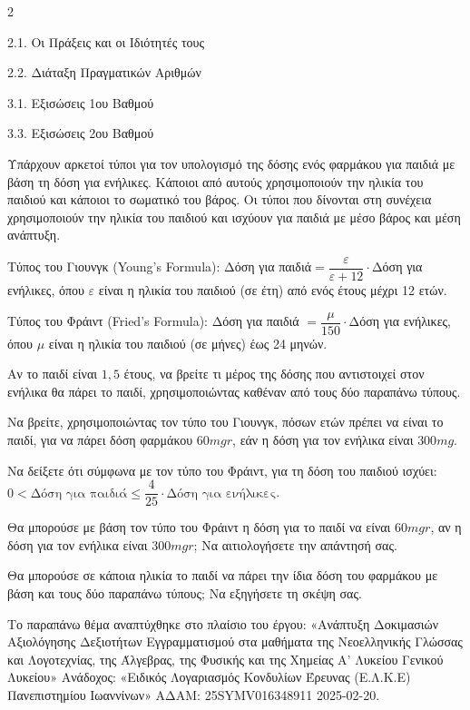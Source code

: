 \begin{ylh}{2}
    \item 2.1. Οι Πράξεις και οι Ιδιότητές τους
    \item 2.2. Διάταξη Πραγματικών Αριθμών
    \item 3.1. Εξισώσεις 1ου Βαθμού
    \item 3.3. Εξισώσεις 2ου Βαθμού
\end{ylh}
Υπάρχουν αρκετοί τύποι για τον υπολογισμό της δόσης ενός φαρμάκου για παιδιά με βάση τη δόση για ενήλικες. Κάποιοι από αυτούς χρησιμοποιούν την ηλικία του παιδιού και κάποιοι το σωματικό του βάρος. Οι τύποι που δίνονται στη συνέχεια χρησιμοποιούν την ηλικία του παιδιού και ισχύουν για παιδιά με μέσο βάρος και μέση ανάπτυξη.

Τύπος του Γιουνγκ (Young's Formula): Δόση για παιδιά$ = \dfrac{\varepsilon}{\varepsilon + 12} \cdot $Δόση για ενήλικες, όπου $\varepsilon$ είναι η ηλικία του παιδιού (σε έτη) από ενός έτους μέχρι 12 ετών.

Τύπος του Φράιντ (Fried's Formula): Δόση για παιδιά $ = \dfrac{\mu}{150} \cdot $Δόση για ενήλικες, όπου $\mu$ είναι η ηλικία του παιδιού (σε μήνες) έως 24 μηνών.
\begin{alist}
\item Αν το παιδί είναι $1,5$ έτους, να βρείτε τι μέρος της δόσης που αντιστοιχεί στον ενήλικα θα πάρει το παιδί, χρησιμοποιώντας καθέναν από τους δύο παραπάνω τύπους.
\item
\begin{rlist}
\item Να βρείτε, χρησιμοποιώντας τον τύπο του Γιουνγκ, πόσων ετών πρέπει να είναι το παιδί, για να πάρει δόση φαρμάκου $60\si{mgr}$, εάν η δόση για τον ενήλικα είναι $300\si{mg}$.
\item Να δείξετε ότι σύμφωνα με τον τύπο του Φράιντ, για τη δόση του παιδιού ισχύει:
$0 < \text{Δόση για παιδιά} \leq \dfrac{4}{25} \cdot \text{Δόση για ενήλικες}$.
\item Θα μπορούσε με βάση τον τύπο του Φράιντ η δόση για το παιδί να είναι $60\si{mgr}$, αν η δόση για τον ενήλικα είναι $300\si{mgr}$; Να αιτιολογήσετε την απάντησή σας.
\end{rlist}
\item Θα μπορούσε σε κάποια ηλικία το παιδί να πάρει την ίδια δόση του φαρμάκου με βάση και τους δύο παραπάνω τύπους; Να εξηγήσετε τη σκέψη σας.

{\footnotesize Το παραπάνω θέμα αναπτύχθηκε στο πλαίσιο του έργου: «Ανάπτυξη Δοκιμασιών Αξιολόγησης Δεξιοτήτων Εγγραμματισμού στα μαθήματα της Νεοελληνικής Γλώσσας και Λογοτεχνίας, της Άλγεβρας, της Φυσικής και της Χημείας Α' Λυκείου Γενικού Λυκείου» Ανάδοχος: «Ειδικός Λογαριασμός Κονδυλίων Έρευνας (Ε.Λ.Κ.Ε) Πανεπιστημίου Ιωαννίνων» ΑΔΑΜ: 25SYMV016348911 2025-02-20.}
\end{alist}

